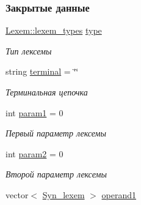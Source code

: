 \subsubsection*{Закрытые данные}
\begin{DoxyCompactItemize}
\item 
\hypertarget{class_syn__lexem_a8a7ffdf228251a8f3d804ac9b03c5122}{}\hyperlink{class_lexem_af335177220e991d190a36fabef7ecbf4}{Lexem\+::lexem\+\_\+types} \hyperlink{class_syn__lexem_a8a7ffdf228251a8f3d804ac9b03c5122}{type}\label{class_syn__lexem_a8a7ffdf228251a8f3d804ac9b03c5122}

\begin{DoxyCompactList}\small\item\em Тип лексемы \end{DoxyCompactList}\item 
\hypertarget{class_syn__lexem_a60715814abcd1fe72ba3583eed998ea3}{}string \hyperlink{class_syn__lexem_a60715814abcd1fe72ba3583eed998ea3}{terminal} = \char`\"{}\char`\"{}\label{class_syn__lexem_a60715814abcd1fe72ba3583eed998ea3}

\begin{DoxyCompactList}\small\item\em Терминальная цепочка \end{DoxyCompactList}\item 
\hypertarget{class_syn__lexem_a514891b78ea7e818210be401075371aa}{}int \hyperlink{class_syn__lexem_a514891b78ea7e818210be401075371aa}{param1} = 0\label{class_syn__lexem_a514891b78ea7e818210be401075371aa}

\begin{DoxyCompactList}\small\item\em Первый параметр лексемы \end{DoxyCompactList}\item 
\hypertarget{class_syn__lexem_a05e633f5cc7073402b8324a28fba6c54}{}int \hyperlink{class_syn__lexem_a05e633f5cc7073402b8324a28fba6c54}{param2} = 0\label{class_syn__lexem_a05e633f5cc7073402b8324a28fba6c54}

\begin{DoxyCompactList}\small\item\em Второй параметр лексемы \end{DoxyCompactList}\item 
\hypertarget{class_syn__lexem_ac1273e1e14c1f7912bf6ca79e9ce3a2b}{}vector$<$ \hyperlink{class_syn__lexem}{Syn\+\_\+lexem} $>$ \hyperlink{class_syn__lexem_ac1273e1e14c1f7912bf6ca79e9ce3a2b}{operand1}\label{class_syn__lexem_ac1273e1e14c1f7912bf6ca79e9ce3a2b}


\end{DoxyCompactItemize}
